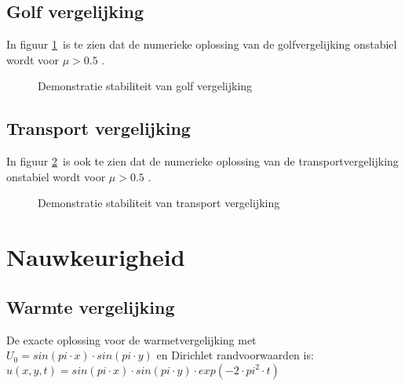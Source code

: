 \documentclass[11pt]{article} %
\begin{document}
	\clearpage
	\subsection{Golf vergelijking}

In figuur \ref{fig:Golf}\ is te zien dat de numerieke oplossing van de golfvergelijking onstabiel wordt voor $\mu > 0.5$ .	
	
	\begin{figure}[H]
		\centering
		\caption{Demonstratie stabiliteit van golf vergelijking}
	\label{fig:Golf}		
	\end{figure}
	
	\clearpage
	
	\subsection{Transport vergelijking}
	In figuur \ref{fig:Transport}\ is ook te zien dat de numerieke oplossing van de transportvergelijking onstabiel wordt voor $\mu > 0.5$ .
	\begin{figure}[H]
		\centering
		\caption{Demonstratie stabiliteit van transport vergelijking}
	\label{fig:Transport}
	\end{figure}
\section{Nauwkeurigheid}


	\subsection{Warmte vergelijking}
De exacte oplossing voor de warmetvergelijking met $U_0=sin(pi\cdot x)\cdot sin(pi \cdot y)$ en Dirichlet randvoorwaarden is: $u(x,y,t)= sin(pi\cdot x)\cdot sin(pi\cdot y)\cdot exp(-2\cdot pi^2\cdot t) $ 
	
\end{document}

